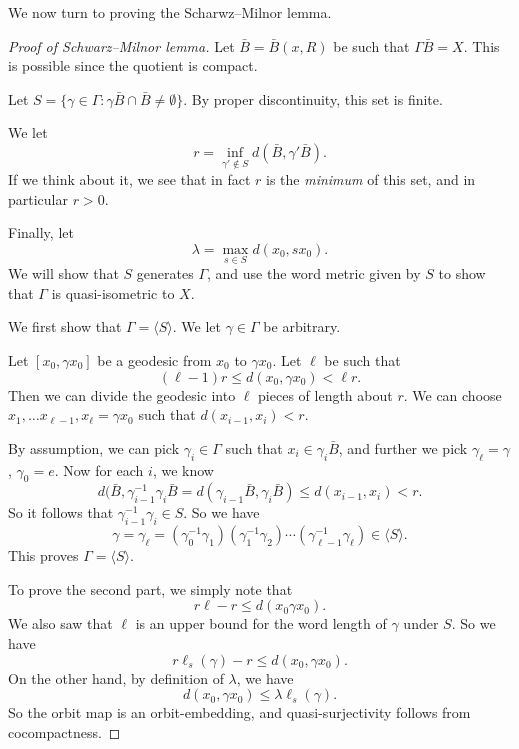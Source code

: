 \documentclass[a4paper]{article}
\begin{document}
We now turn to proving the Scharwz--Milnor lemma.
\begin{proof}[Proof of Schwarz--Milnor lemma]
  Let $\bar{B} = \bar{B}(x, R)$ be such that $\Gamma \bar{B} = X$. This is possible since the quotient is compact.

  Let $S = \{\gamma \in \Gamma: \gamma \bar{B} \cap \bar{B} \not=\emptyset\}$. By proper discontinuity, this set is finite.

  We let
  \[
    r = \inf_{\gamma' \not \in S} d(\bar{B}, \gamma' \bar{B}).
  \]
  If we think about it, we see that in fact $r$ is the \emph{minimum} of this set, and in particular $r > 0$.

  Finally, let
  \[
    \lambda = \max_{s \in S} d(x_0, s x_0).
  \]
  We will show that $S$ generates $\Gamma$, and use the word metric given by $S$ to show that $\Gamma$ is quasi-isometric to $X$.

  We first show that $\Gamma = \langle S\rangle$. We let $\gamma \in \Gamma$ be arbitrary.

  Let $[x_0, \gamma x_0]$ be a geodesic from $x_0$ to $\gamma x_0$. Let $\ell$ be such that
  \[
    (\ell - 1)r  \leq d(x_0, \gamma x_0) < \ell r.
  \]
  Then we can divide the geodesic into $\ell$ pieces of length about $r$. We can choose $x_1, \ldots x_{\ell - 1}, x_\ell = \gamma x_0$ such that $d(x_{i - 1}, x_i) < r$.

  By assumption, we can pick $\gamma_i \in \Gamma$ such that $x_i \in \gamma_i \bar{B}$, and further we pick $\gamma_\ell = \gamma$, $\gamma_0 = e$. Now for each $i$, we know
  \[
    d(\bar{B}, \gamma_{i -1 }^{-1} \gamma_i \bar{B} = d(\gamma_{i - 1} \bar{B}, \gamma_i \bar{B}) \leq d(x_{i - 1}, x_i) < r.
  \]
  So it follows that $\gamma_{i - 1}^{-1} \gamma_i \in S$. So we have
  \[
    \gamma = \gamma_\ell = (\gamma_0^{-1} \gamma_1) (\gamma_1^{-1}\gamma_2) \cdots (\gamma_{\ell - 1}^{-1}\gamma_\ell) \in \langle S\rangle.
  \]
  This proves $\Gamma = \langle S \rangle$.

  To prove the second part, we simply note that
  \[
    r\ell - r \leq d (x_0 \gamma x_0).
  \]
  We also saw that $\ell$ is an upper bound for the word length of $\gamma$ under $S$. So we have
  \[
    r \ell_s(\gamma) - r \leq d(x_0, \gamma x_0).
  \]
  On the other hand, by definition of $\lambda$, we have
  \[
    d(x_0, \gamma x_0) \leq \lambda \ell_s(\gamma).
  \]
  So the orbit map is an orbit-embedding, and quasi-surjectivity follows from cocompactness. %
\end{proof}
\end{document}
